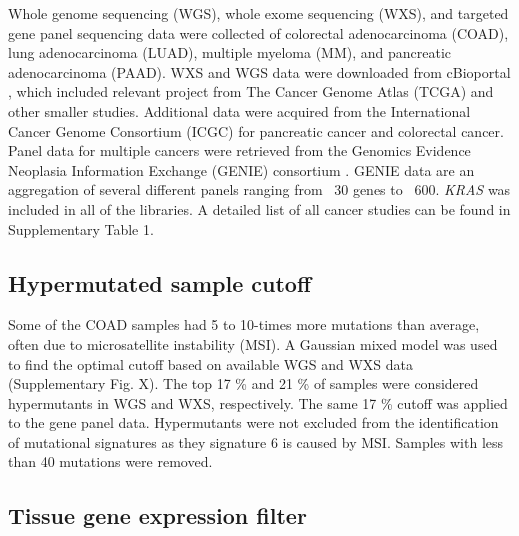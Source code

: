 \documentclass[english, 12pt, letterpaper]{article}
\newcommand{\KRAS}{\emph{KRAS}}
\begin{document}
Whole genome sequencing (WGS), whole exome sequencing (WXS), and targeted gene panel sequencing data were collected of colorectal adenocarcinoma (COAD), lung adenocarcinoma (LUAD), multiple myeloma (MM), and pancreatic adenocarcinoma (PAAD).
WXS and WGS data were downloaded from cBioportal \cite{Gao2013, Cerami2012}, which included relevant project from The Cancer Genome Atlas (TCGA) \cite{CancerGenomeAtlasNetwork2012, CancerGenomeAtlasResearchNetwork2014, CancerGenomeAtlasResearchNetwork.Electronicaddress:andrew_aguirredfci.harvard.edu2017} and other smaller studies. 
Additional data were acquired from the International Cancer Genome Consortium (ICGC) for pancreatic cancer \cite{Scarlett2011} and colorectal cancer. 
Panel data for multiple cancers were retrieved from the Genomics Evidence Neoplasia Information Exchange (GENIE) consortium \cite{AACRProjectGENIEConsortium2017AACRConsortium.}.
GENIE data are an aggregation of several different panels ranging from ~30 genes to ~600.
\KRAS{} was included in all of the libraries. 
A detailed list of all cancer studies can be found in Supplementary Table 1.


\subsection*{Hypermutated sample cutoff}

Some of the COAD samples had 5 to 10-times more mutations than average, often due to microsatellite instability (MSI). 
A Gaussian mixed model was used to find the optimal cutoff based on available WGS and WXS data (Supplementary Fig. X). 
The top 17 \% and 21 \% of samples were considered hypermutants in WGS and WXS, respectively.
The same 17 \% cutoff was applied to the gene panel data. 
Hypermutants were not excluded from the identification of mutational signatures as they signature 6 is caused by MSI.
Samples with less than 40 mutations were removed.


\subsection*{Tissue gene expression filter}
\end{document}

